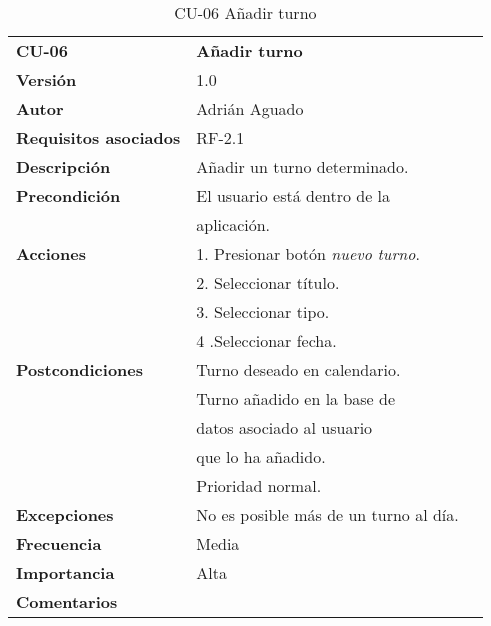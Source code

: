 \begin{table}
\begin{tabular}{llr}  
\toprule
\begin{minipage}[b]{0.24\columnwidth}\raggedright\strut
\textbf{CU-06}\strut
\end{minipage} & \begin{minipage}[b]{0.72\columnwidth}\raggedright\strut
\textbf{Añadir turno}\strut
\end{minipage}\tabularnewline
\cmidrule(r){1-2}
\textbf{Versión}       & 1.0           \\
\textbf{Autor}       & Adrián  Aguado    \\
\textbf{Requisitos asociados}       & RF-2.1 \\ 
\textbf{Descripción} & Añadir un turno determinado. \\
\textbf{Precondición} & El usuario está dentro de la \\
& aplicación.       \\
\textbf{Acciones} & 1. Presionar  botón \emph{nuevo turno}. \\
& 2. Seleccionar título. \\
& 3. Seleccionar tipo. \\
& 4 .Seleccionar fecha.\\
\textbf{Postcondiciones} & Turno deseado en calendario. \\
& Turno añadido en la base de \\
&  datos asociado al usuario \\
&  que lo ha añadido.  \\
&  Prioridad normal.  \\
\textbf{Excepciones} &  No es posible más de un turno al día.   \\
\textbf{Frecuencia} & Media          \\
\textbf{Importancia} & Alta            \\
\textbf{Comentarios } &     \\
\bottomrule
\end{tabular}
\caption{CU-06 Añadir turno} 
\end{table}




